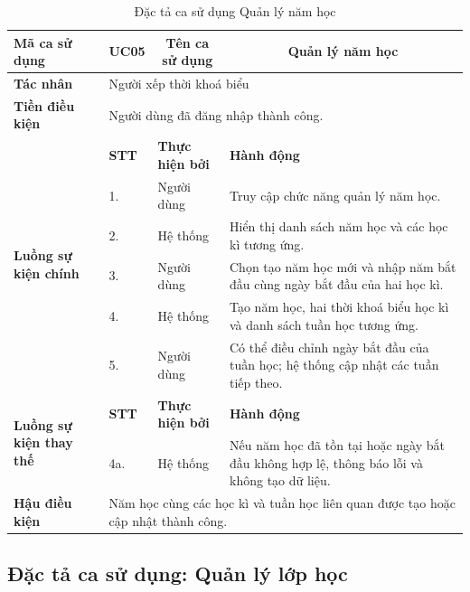 \documentclass[../DoAn.tex]{subfiles}
\begin{document}
\begin{longtable}{|p{2.8cm}|p{1cm}|p{2.8cm}|p{6.3cm}|}
\caption{Đặc tả ca sử dụng Quản lý năm học}
\label{tab:app_uc_quan_ly_nam_hoc} \\
\hline
\multicolumn{1}{|l|}{\textbf{Mã ca sử dụng}} & \multicolumn{1}{c|}{UC05} &
\multicolumn{1}{c|}{\textbf{Tên ca sử dụng}} & \multicolumn{1}{c|}{Quản lý năm học} \\
\hline
\multicolumn{1}{|l|}{\textbf{Tác nhân}} & \multicolumn{3}{l|}{Người xếp thời khoá biểu} \\
\hline
\multicolumn{1}{|l|}{\textbf{Tiền điều kiện}} & \multicolumn{3}{l|}{Người dùng đã đăng nhập thành công.} \\
\hline
\multirow{6}{2.8cm}{\textbf{Luồng sự kiện chính}} & \textbf{STT} & \textbf{Thực hiện bởi} & \textbf{Hành động} \\
\cline{2-4}
& 1. & Người dùng & Truy cập chức năng quản lý năm học. \\
\cline{2-4}
& 2. & Hệ thống & Hiển thị danh sách năm học và các học kì tương ứng. \\
\cline{2-4}
& 3. & Người dùng & Chọn tạo năm học mới và nhập năm bắt đầu cùng ngày bắt đầu của hai học kì. \\
\cline{2-4}
& 4. & Hệ thống & Tạo năm học, hai thời khoá biểu học kì và danh sách tuần học tương ứng. \\
\cline{2-4}
& 5. & Người dùng & Có thể điều chỉnh ngày bắt đầu của tuần học; hệ thống cập nhật các tuần tiếp theo. \\
\hline
\multirow{2}{2.8cm}{\textbf{Luồng sự kiện thay thế}} & \textbf{STT} & \textbf{Thực hiện bởi} & \textbf{Hành động} \\
\cline{2-4}
& 4a. & Hệ thống & Nếu năm học đã tồn tại hoặc ngày bắt đầu không hợp lệ, thông báo lỗi và không tạo dữ liệu. \\
\hline
\multicolumn{1}{|l|}{\textbf{Hậu điều kiện}} & \multicolumn{3}{p{10.5cm}|}{Năm học cùng các học kì và tuần học liên quan được tạo hoặc cập nhật thành công.} \\
\hline
\end{longtable}

\subsection{Đặc tả ca sử dụng: Quản lý lớp học}
\end{document}

